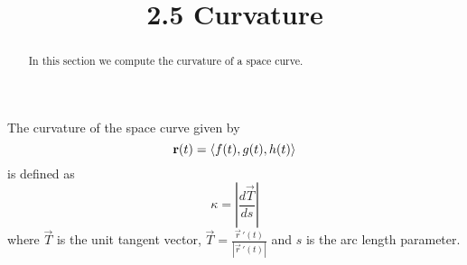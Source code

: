 \documentclass[handout]{ximera}
\title{2.5 Curvature}
\begin{document}
\begin{abstract}
In this section we compute the curvature of a space curve.
\end{abstract}

\maketitle


\begin{definition}[Curvature]
The curvature of the space curve given by
\[
\mathbf r(t) = \left\langle f(t), g(t), h(t)\right\rangle
\]
is defined as
\[
\kappa = \left|\frac{d\vec T}{ds}\right|
\]
where $\vec T$ is the unit tangent vector, $\vec T = \frac{\vec r\,'(t)}{|\vec r\,'(t)|}$ and $s$ is the 
arc length parameter.
\end{definition}
\end{document}
